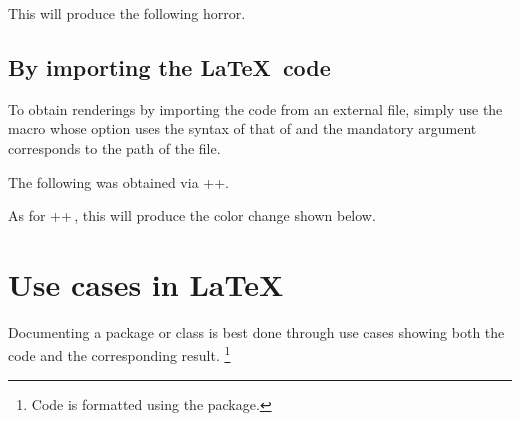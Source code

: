 

\begin{tdocexa}
    \leavevmode



    This will produce the following horror.

    \medskip

    

\end{tdocexa}


\subsection{By importing the \LaTeX\ code}

To obtain renderings by importing the code from an external file, simply use the  macro whose option uses the syntax of that of  and the mandatory argument corresponds to the path of the file.


\begin{tdocexa}
    The following was obtained via \tdocinlatex++.

    \medskip



    \medskip

    As for \tdocinlatex++\,, this will produce the color change shown below.

    \medskip


\end{tdocexa}


\section{Use cases in \LaTeX}

Documenting a package or class is best done through use cases showing both the code and the corresponding result.
\footnote{
    Code is formatted using the  package.
}


%


